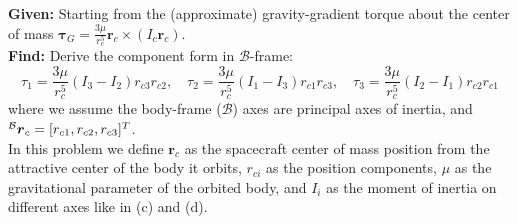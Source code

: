 \documentclass[titlepage]{article}
\begin{document}
\textbf{Given:}
Starting from the (approximate) gravity-gradient torque about the center of mass $\boldsymbol{\tau}_G=\frac{3\mu}{r_c^5}\boldsymbol{r}_c\times(I_c\boldsymbol{r}_c)$.\\

\textbf{Find:}
Derive the component form in $\mathcal{B}$-frame:
\begin{equation}
	\tau_1=\frac{3\mu}{r_c^5}(I_3-I_2)r_{c3}r_{c2},\quad\tau_2=\frac{3\mu}{r_c^5}(I_1-I_3)r_{c1}r_{c3},\quad\tau_3=\frac{3\mu}{r_c^5}(I_2-I_1)r_{c2}r_{c1}
\end{equation}
where we assume the body-frame ($\mathcal{B}$) axes are principal axes of inertia, and $\prescript{\mathcal{B}}{}{\boldsymbol{r}}_c=[r_{c1},r_{c2},r_{c3}]^T$.\\

In this problem we define $\boldsymbol{r}_c$ as the spacecraft center of mass position from the attractive center of the body it orbits, $r_{ci}$ as the position components, $\mu$ as the gravitational parameter of the orbited body, and $I_i$ as the moment of inertia on different axes like in (c) and (d).\\
\end{document}
